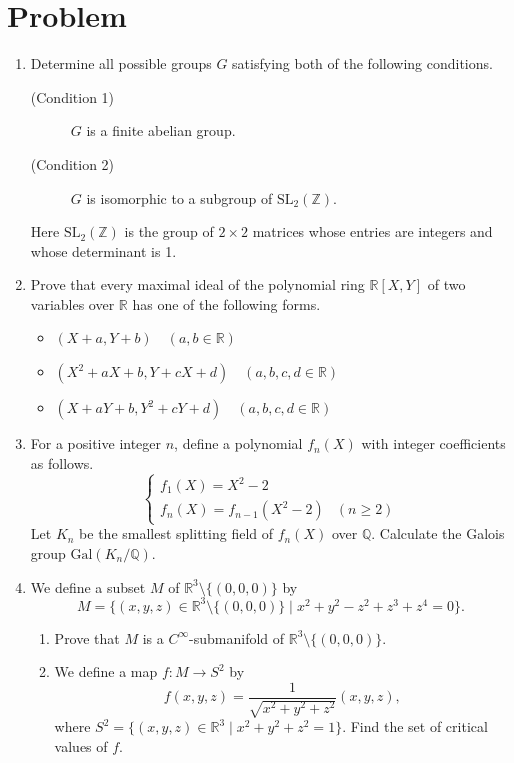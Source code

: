 \documentclass{article}
\begin{document}
\section*{Problem}
\begin{enumerate}[label=\fbox{\arabic*}]
  \item Determine all possible groups $G$ satisfying both of the following conditions.
        \begin{description}
          \item[(Condition 1)] $G$ is a finite abelian group.
          \item[(Condition 2)] $G$ is isomorphic to a subgroup of $\mathrm{SL}_2(\mathbb{Z})$.
        \end{description}
        Here $\mathrm{SL}_2(\mathbb{Z})$ is the group of $2 \times 2$ matrices whose entries are integers and whose determinant is 1.

  \item Prove that every maximal ideal of the polynomial ring $\mathbb{R}[X, Y]$ of two variables over $\mathbb{R}$ has one of the following forms.
        \begin{itemize}
          \item $(X + a, Y + b) \quad (a, b \in \mathbb{R})$
          \item $(X^2 + aX + b, Y + cX + d) \quad (a, b, c, d \in \mathbb{R})$
          \item $(X + aY + b, Y^2 + cY + d) \quad (a, b, c, d \in \mathbb{R})$
        \end{itemize}

  \item For a positive integer $n$, define a polynomial $f_n(X)$ with integer coefficients as follows.
        \[
          \begin{cases}
            f_1(X) = X^2 - 2 \\
            f_n(X) = f_{n-1}(X^2 - 2) & (n \ge 2)
          \end{cases}
        \]
        Let $K_n$ be the smallest splitting field of $f_n(X)$ over $\mathbb{Q}$. Calculate the Galois group $\mathrm{Gal}(K_n/\mathbb{Q})$.

  \item We define a subset $M$ of $\mathbb{R}^3 \setminus \{(0, 0, 0)\}$ by
        \[
          M = \{ (x, y, z) \in \mathbb{R}^3 \setminus \{(0, 0, 0)\} \mid x^2 + y^2 - z^2 + z^3 + z^4 = 0 \}.
        \]
        \begin{enumerate}[label=(\arabic*)]
          \item Prove that $M$ is a $C^\infty$-submanifold of $\mathbb{R}^3 \setminus \{(0, 0, 0)\}$.
          \item We define a map $f: M \to S^2$ by
                \[
                  f(x, y, z) = \frac{1}{\sqrt{x^2 + y^2 + z^2}} (x, y, z),
                \]
                where $S^2 = \{ (x, y, z) \in \mathbb{R}^3 \mid x^2 + y^2 + z^2 = 1 \}$.
                Find the set of critical values of $f$.
        \end{enumerate}


\end{enumerate}
\end{document}
